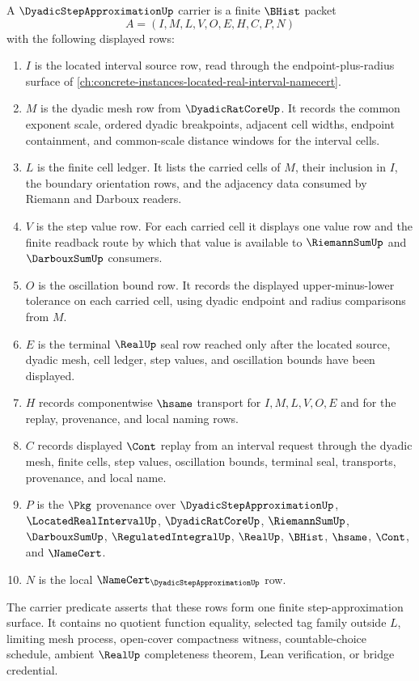 \begin{definition}
\label{def:dyadic-step-approximation-carrier}
A $\DyadicStepApproximationUp$ carrier is a finite $\BHist$ packet
$$
A=(I,M,L,V,O,E,H,C,P,N)
$$
with the following displayed rows:
\begin{enumerate}
\item $I$ is the located interval source row, read through the endpoint-plus-radius surface of \autoref{ch:concrete-instances-located-real-interval-namecert}.
\item $M$ is the dyadic mesh row from $\DyadicRatCoreUp$. It records the common exponent scale, ordered dyadic breakpoints, adjacent cell widths, endpoint containment, and common-scale distance windows for the interval cells.
\item $L$ is the finite cell ledger. It lists the carried cells of $M$, their inclusion in $I$, the boundary orientation rows, and the adjacency data consumed by Riemann and Darboux readers.
\item $V$ is the step value row. For each carried cell it displays one value row and the finite readback route by which that value is available to $\RiemannSumUp$ and $\DarbouxSumUp$ consumers.
\item $O$ is the oscillation bound row. It records the displayed upper-minus-lower tolerance on each carried cell, using dyadic endpoint and radius comparisons from $M$.
\item $E$ is the terminal $\RealUp$ seal row reached only after the located source, dyadic mesh, cell ledger, step values, and oscillation bounds have been displayed.
\item $H$ records componentwise $\hsame$ transport for $I,M,L,V,O,E$ and for the replay, provenance, and local naming rows.
\item $C$ records displayed $\Cont$ replay from an interval request through the dyadic mesh, finite cells, step values, oscillation bounds, terminal seal, transports, provenance, and local name.
\item $P$ is the $\Pkg$ provenance over $\DyadicStepApproximationUp$, $\LocatedRealIntervalUp$, $\DyadicRatCoreUp$, $\RiemannSumUp$, $\DarbouxSumUp$, $\RegulatedIntegralUp$, $\RealUp$, $\BHist$, $\hsame$, $\Cont$, and $\NameCert$.
\item $N$ is the local $\NameCert_{\DyadicStepApproximationUp}$ row.
\end{enumerate}
The carrier predicate asserts that these rows form one finite step-approximation surface. It contains no quotient function equality, selected tag family outside $L$, limiting mesh process, open-cover compactness witness, countable-choice schedule, ambient $\RealUp$ completeness theorem, Lean verification, or bridge credential.
\end{definition}

